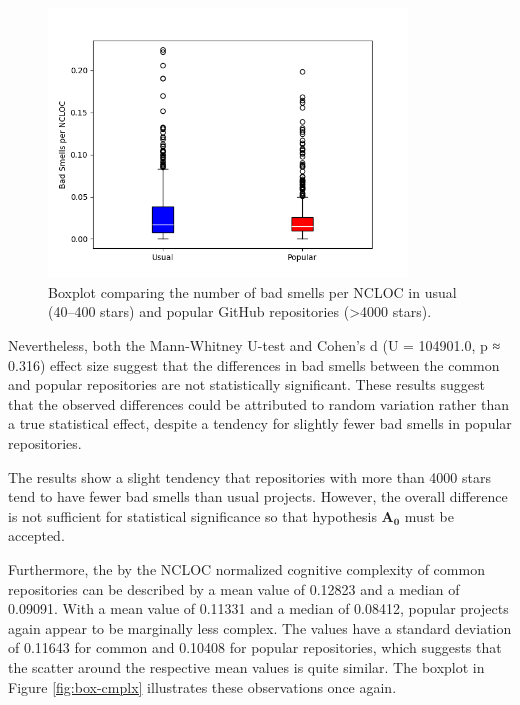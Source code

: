 \documentclass[a4paper, 12pt]{article}
\begin{document}
\begin{figure}[h]
  \centering
  \includegraphics[width=0.85\textwidth]{../media/smells-boxplot.png}
  \caption{Boxplot comparing the number of bad smells per NCLOC in usual (40--400 stars) and popular GitHub repositories (>4000 stars).}
  \label{fig:box-smells}
\end{figure}

Nevertheless, both the Mann-Whitney U-test and Cohen's d (U = 104901.0, p ≈ 0.316) effect size suggest that the differences in bad smells between the common and popular repositories are not statistically significant. These results suggest that the observed differences could be attributed to random variation rather than a true statistical effect, despite a tendency for slightly fewer bad smells in popular repositories.

\vspace{0.5em}
\begin{leftbar}
The results show a slight tendency that repositories with more than 4000 stars tend to have fewer bad smells than usual projects. However, the overall difference is not sufficient for statistical significance so that hypothesis $\mathbf{A_0}$ must be accepted.
\end{leftbar}
\vspace{0.5em}

Furthermore, the by the NCLOC normalized cognitive complexity of common repositories can be described by a mean value of 0.12823 and a median of 0.09091. With a mean value of 0.11331 and a median of 0.08412, popular projects again appear to be marginally less complex. The values have a standard deviation of 0.11643 for common and 0.10408 for popular repositories, which suggests that the scatter around the respective mean values is quite similar. The boxplot in Figure \ref{fig:box-cmplx} illustrates these observations once again.\\
\end{document}
